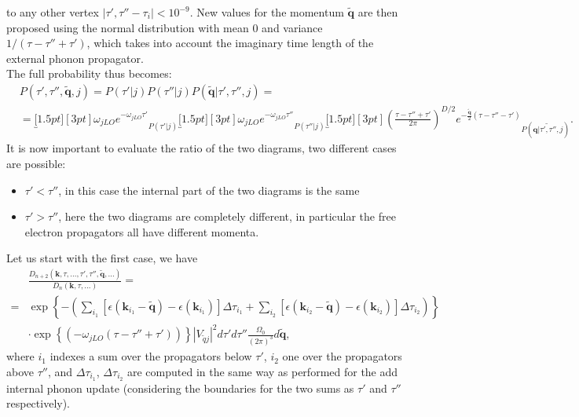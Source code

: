 to any other vertex $|\tau',\tau''-\tau_i|<10^{-9}$. New values for the momentum $\tilde{\mathbf{q}}$ are then proposed using the normal distribution 
with mean $0$ and variance $1/(\tau -\tau''+\tau')$, which takes into account the imaginary time length of the external phonon propagator.\\
The full probability thus becomes:
\begin{equation}
\begin{split}
    &P(\tau',\tau'',\tilde{\mathbf{q}},j)=P(\tau'|j)P(\tau''|j)P(\tilde{\mathbf{q}}|\tau',\tau'',j)=\\
    &=\underbracket[1.5pt][3pt]{\omega_{jLO}e^{-\omega_{jLO}\tau'}}_{P(\tau'|j)}\underbracket[1.5pt][3pt]{\omega_{jLO}e^{-\omega_{jLO}\tau''}}_{P(\tau''|j)}
    \underbracket[1.5pt][3pt]{\left(\frac{\tau-\tau''+\tau'}{2\pi}\right)^{D/2}e^{-\frac{\tilde{\mathbf{q}}}{2}(\tau-\tau''-\tau')}}_{P(\tilde{\mathbf{q}|\tau',\tau'',j})}.
\end{split}
\end{equation}
It is now important to evaluate the ratio of the two diagrams, two different cases are possible:
\begin{itemize}
    \item $\tau'<\tau''$, in this case the internal part of the two diagrams is the same
    \item $\tau'>\tau''$, here the two diagrams are completely different, in particular the free electron propagators all have different momenta.
\end{itemize}
Let us start with the first case, we have
\begin{equation}
\begin{split}
    &\frac{D_{n+2}(\mathbf{k},\tau,...,\tau',\tau'',\tilde{\mathbf{q}},...)}{D_n(\mathbf{k},\tau,...)}=\\
    =&\exp\left\{-\left(\sum_{i_1}\left[\epsilon(\mathbf{k}_{i_1}-\tilde{\mathbf{q}})-\epsilon(\mathbf{k}_{i_1})\right]\Delta\tau_{i_1}+\sum_{i_2}\left[\epsilon(\mathbf{k}_{i_2}-\tilde{\mathbf{q}})-\epsilon(\mathbf{k}_{i_2})\right]\Delta\tau_{i_2}\right)\right\}\\
    &\cdot\exp{\left\{\left(-\omega_{jLO}(\tau-\tau''+\tau')\right)\right\}}|V_{\tilde{q}j}|^2d\tau'd\tau''\frac{\Omega_0}{(2\pi)^3}d\tilde{\mathbf{q}},
\end{split}
\end{equation}
where $i_1$ indexes a sum over the propagators below $\tau'$, $i_2$ one over the propagators above $\tau''$, and $\Delta\tau_{i_1}$, $\Delta\tau_{i_2}$ 
are computed in the same way as performed for the add internal phonon update (considering the boundaries for the two sums as $\tau'$ and $\tau''$ respectively).\\
